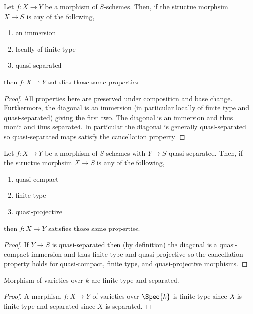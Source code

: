 \documentclass[12pt]{article}
\begin{document}
\begin{cor}
Let $f : X \to Y$ be a morphism of $S$-schemes. Then, if the structue morphsim $X \to S$ is any of the following,
\begin{enumerate}
\item an immersion
\item locally of finite type
\item quasi-separated
\end{enumerate}
then $f : X \to Y$ satisfies those same properties.
\end{cor}

\begin{proof}
All properties here are preserved under composition and base change. Furthermore, the diagonal is an immersion (in particular locally of finite type and quasi-separated) giving the first two. 
The diagonal is an immersion and thus monic and thus separated. In particular the diagonal is generally quasi-separated so quasi-separated maps satisfy the cancellation property.
\end{proof}


\begin{cor}
Let $f : X \to Y$ be a morphism of $S$-schemes with $Y \to S$ quasi-separated. Then, if the structue morphsim $X \to S$ is any of the following,
\begin{enumerate}
\item quasi-compact
\item finite type
\item quasi-projective
\end{enumerate}
then $f : X \to Y$ satisfies those same properties.
\end{cor}

\begin{proof}
If $Y \to S$ is quasi-separated then (by definition) the diagonal is a quasi-compact immersion and thus finite type and quasi-projective so the cancellation property holds for quasi-compact, finite type, and quasi-projective morphisms.
\end{proof}

\begin{cor}
Morphism of varieties over $k$ are finite type and separated. 
\end{cor}

\begin{proof}
A morphism $f : X \to Y$ of varieties over $\Spec{k}$ is finite type since $X$ is finite type and separated since $X$ is separated.
\end{proof}
\end{document}
